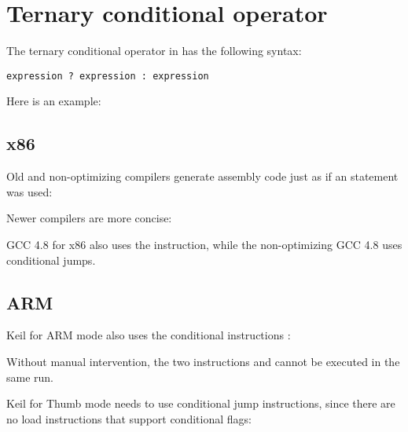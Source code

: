 \section{Ternary conditional operator}
\label{chap:cond}

The ternary conditional operator in \CCpp has the following syntax:

\begin{lstlisting}
expression ? expression : expression
\end{lstlisting}

Here is an example:



\subsection{x86}

Old and non-optimizing compilers generate assembly code just as if an  statement was used:





Newer compilers are more concise:



\Optimizing GCC 4.8 for x86 also uses the  instruction, while the non-optimizing GCC 4.8 uses conditional jumps.

\ifdefined\IncludeARM
\subsection{ARM}

\Optimizing Keil for ARM mode also uses the conditional instructions :



Without manual intervention, the two instructions  and  cannot be executed in the same run.

\Optimizing Keil for Thumb mode needs to use conditional jump instructions, since there are no load instructions
that support conditional flags:

